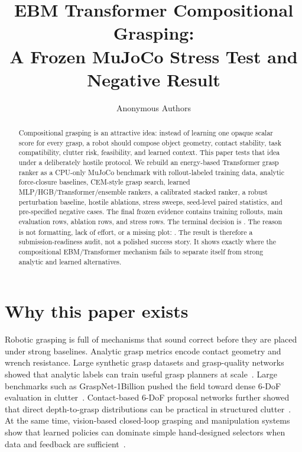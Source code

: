 \documentclass{article}
\title{EBM Transformer Compositional Grasping:\\A Frozen MuJoCo Stress Test and Negative Result}
\author{Anonymous Authors}
\begin{document}
\maketitle

\begin{abstract}
Compositional grasping is an attractive idea: instead of learning one opaque scalar score for every grasp, a robot should compose object geometry, contact stability, task compatibility, clutter risk, feasibility, and learned context.
This paper tests that idea under a deliberately hostile protocol.
We rebuild an energy-based Transformer grasp ranker as a CPU-only MuJoCo benchmark with rollout-labeled training data, analytic force-closure baselines, CEM-style grasp search, learned MLP/HGB/Transformer/ensemble rankers, a calibrated stacked ranker, a robust perturbation baseline, hostile ablations, stress sweeps, seed-level paired statistics, and pre-specified negative cases.
The final frozen evidence contains \TrainingRows{} training rollouts, \MainRows{} main evaluation rows, \AblationRows{} ablation rows, and \StressRows{} stress rows.
The terminal decision is \textbf{\PaperDecision}.
The reason is not formatting, lack of effort, or a missing plot: \PaperDecisionReason.
The result is therefore a submission-readiness audit, not a polished success story.
It shows exactly where the compositional EBM/Transformer mechanism fails to separate itself from strong analytic and learned alternatives.
\end{abstract}

\section{Why this paper exists}

Robotic grasping is full of mechanisms that sound correct before they are placed under strong baselines.
Analytic grasp metrics encode contact geometry and wrench resistance.
Large synthetic grasp datasets and grasp-quality networks showed that analytic labels can train useful grasp planners at scale~\citep{mahler2017dexnet2}.
Large benchmarks such as GraspNet-1Billion pushed the field toward dense 6-DoF evaluation in clutter~\citep{fang2020graspnet}.
Contact-based 6-DoF proposal networks further showed that direct depth-to-grasp distributions can be practical in structured clutter~\citep{sundermeyer2021contactgraspnet}.
At the same time, vision-based closed-loop grasping and manipulation systems show that learned policies can dominate simple hand-designed selectors when data and feedback are sufficient~\citep{kalashnikov2018qtopt,zeng2018vpg}.
\end{document}
